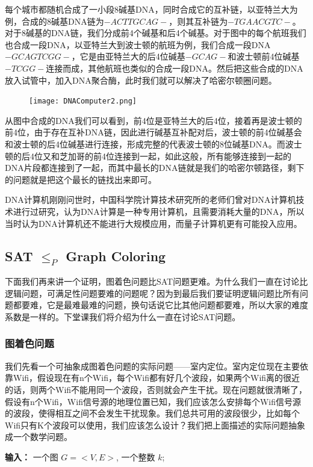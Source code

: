 每个城市都随机合成了一小段8碱基DNA，同时合成它的互补链，以亚特兰大为例，合成的8碱基DNA链为$-ACTTGCAG-$，则其互补链为$-TGAACGTC-$。对于8碱基的DNA链，我们分成前4个碱基和后4个碱基。对于图中的每个航班我们也合成一段DNA，以亚特兰大到波士顿的航班为例，我们合成一段DNA$-GCAGTCGG-$，它是由亚特兰大的后4位碱基$-GCAG-$和波士顿前4位碱基$-TCGG-$连接而成，其他航班也类似的合成一段DNA。然后把这些合成的DNA放入试管中，加入DNA聚合酶，此时我们就可以解决了哈密尔顿圈问题。

\begin{figure}[H]
\centering
 \texttt{[image: DNAComputer2.png]}
\end{figure}

从图中合成的DNA我们可以看到，前4位是亚特兰大的后4位，接着再是波士顿的前4位，由于存在互补DNA链，因此进行碱基互补配对后，波士顿的前4位碱基会和波士顿的后4位碱基进行连接，形成完整的代表波士顿的8位碱基DNA。而波士顿的后4位又和芝加哥的前4位连接到一起，如此这般，所有能够连接到一起的DNA片段都连接到了一起，而其中最长的DNA链就是我们的哈密尔顿路径，剩下的问题就是把这个最长的链找出来即可。

DNA计算机刚刚问世时，中国科学院计算技术研究所的老师们曾对DNA计算机技术进行过研究，认为DNA计算是一种专用计算机，且需要消耗大量的DNA，所以当时认为DNA计算机还不能进行大规模应用，而量子计算机更有可能投入应用。

\subsection{{\sc SAT} $\le_P$ {\sc Graph Coloring}}
下面我们再来讲一个证明，图着色问题比SAT问题更难。为什么我们一直在讨论比逻辑问题，可满足性问题要难的问题呢？因为到最后我们要证明逻辑问题比所有问题都要难，它是最难最难的问题，换句话说它比其他问题都要难，所以大家的难度系数是一样的。下堂课我们将介绍为什么一直在讨论SAT问题。

\subsubsection{图着色问题}

我们先看一个可抽象成图着色问题的实际问题——室内定位。室内定位现在主要依靠Wifi，假设现在有n个Wifi，每个Wifi都有好几个波段，如果两个Wifi离的很近的话，则两个Wifi不能用同一个波段，否则就会产生干扰。现在问题就很清晰了，假设有n个Wifi，Wifi信号源的地理位置已知，我们应该怎么安排每个Wifi信号源的波段，使得相互之间不会发生干扰现象。我们总共可用的波段很少，比如每个Wifi只有K个波段可以使用，我们应该怎么设计？我们把上面描述的实际问题抽象成一个数学问题。

 {\bf 输入：} 一个图 $G=<V,E>$, 一个整数 $k$; 

